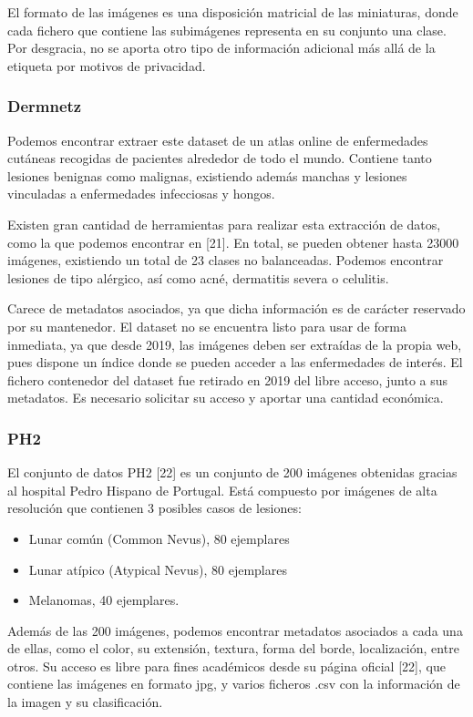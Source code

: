 El formato de las imágenes es una disposición matricial de las miniaturas, donde cada fichero que contiene las subimágenes representa en su conjunto una clase. Por desgracia, no se aporta otro tipo de información adicional más allá de la etiqueta por motivos de privacidad.

\subsubsection{Dermnetz}

Podemos encontrar extraer este dataset de un atlas online de enfermedades cutáneas recogidas de pacientes alrededor de todo el mundo. Contiene tanto lesiones benignas como malignas, existiendo además manchas y lesiones vinculadas a enfermedades infecciosas y hongos. 

Existen gran cantidad de herramientas para realizar esta extracción de datos, como la que podemos encontrar en [21]. En total, se pueden obtener hasta 23000 imágenes, existiendo un total de 23 clases no balanceadas. Podemos encontrar lesiones de tipo alérgico, así como acné, dermatitis severa o celulitis.

Carece de metadatos asociados, ya que dicha información es de carácter reservado por su mantenedor.  El dataset no se encuentra listo para usar de forma inmediata, ya que desde 2019, las imágenes deben ser extraídas de la propia web, pues dispone un índice donde se pueden acceder a las enfermedades de interés. El fichero contenedor del dataset fue retirado en 2019 del libre acceso, junto a sus metadatos. Es necesario solicitar su acceso y aportar una cantidad económica.


\subsubsection{ PH2}
El conjunto de datos PH2 [22] es un conjunto de 200 imágenes obtenidas gracias al hospital Pedro Hispano de Portugal. Está compuesto por imágenes de alta resolución que contienen 3 posibles casos de lesiones:
\begin{itemize}
	\item Lunar común (Common Nevus), 80 ejemplares
	\item Lunar atípico (Atypical Nevus), 80 ejemplares
	\item Melanomas, 40 ejemplares.
\end{itemize}

Además de las 200 imágenes, podemos encontrar metadatos asociados a cada una de ellas, como el color, su extensión, textura, forma del borde, localización, entre otros.
Su acceso es libre para fines académicos desde su página oficial [22], que contiene las imágenes en formato jpg, y varios ficheros .csv con la información de la imagen y su clasificación.

